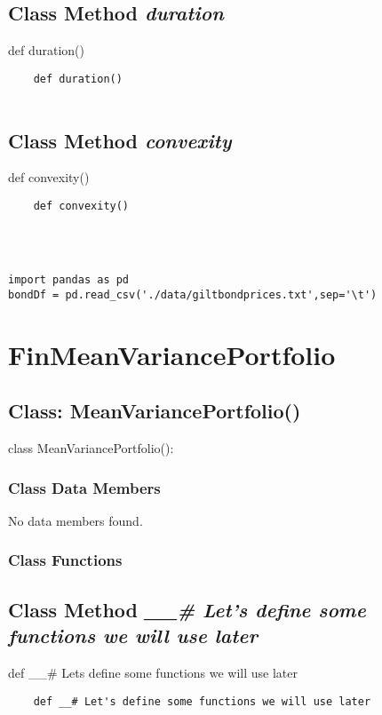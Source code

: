 \documentclass[twoside,11pt]{book}
\begin{document}
\subsection{Class Method {\it duration}}
def duration()

\begin{lstlisting}
    def duration()


\end{lstlisting}

\subsection{Class Method {\it convexity}}
def convexity()

\begin{lstlisting}
    def convexity()
    



import pandas as pd
bondDf = pd.read_csv('./data/giltbondprices.txt',sep='\t')\end{lstlisting}

\newpage
\section{FinMeanVariancePortfolio}

\subsection{Class: MeanVariancePortfolio()}
class MeanVariancePortfolio():

\subsubsection{Class Data Members}
No data members found.

\subsubsection{Class Functions}

\subsection{Class Method {\it \_\_# Let's define some functions we will use later}}
def \_\_\# Lets define some functions we will use later

\begin{lstlisting}
    def __# Let's define some functions we will use later

\end{lstlisting}
\end{document}
